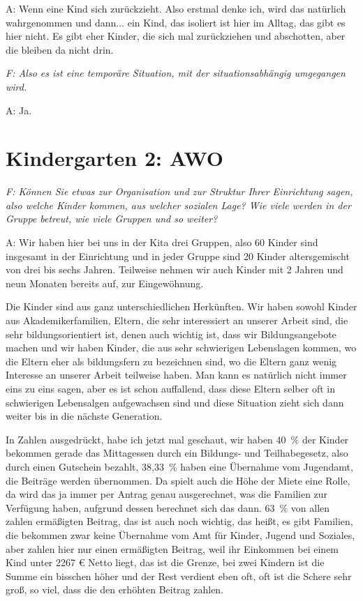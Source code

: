 \begin{linenumbers*}
A: Wenn eine Kind sich zurückzieht. Also erstmal denke ich, wird das natürlich wahrgenommen und dann... ein Kind, das isoliert ist hier im Alltag, das gibt es hier nicht. Es gibt eher Kinder, die sich mal zurückziehen und abschotten, aber die bleiben da nicht drin. 

\emph{F: Also es ist eine temporäre Situation, mit der situationsabhängig umgegangen wird.} 

A: Ja.    
   
\end{linenumbers*}

\section{Kindergarten 2: AWO}
\begin{linenumbers*}
\emph{F:  Können Sie etwas zur Organisation und zur Struktur Ihrer Einrichtung sagen, also welche Kinder kommen, aus welcher sozialen Lage? Wie viele werden in der Gruppe betreut, wie viele Gruppen und so weiter?} 

A: Wir haben hier bei uns in der Kita drei Gruppen, also 60 Kinder sind insgesamt in der Einrichtung und in jeder Gruppe sind 20 Kinder altersgemischt von drei bis sechs Jahren. Teilweise nehmen wir auch Kinder mit 2 Jahren und neun Monaten bereits auf, zur Eingewöhnung. 

Die Kinder sind aus ganz unterschiedlichen Herkünften. Wir haben sowohl Kinder aus Akademikerfamilien, Eltern, die sehr interessiert an unserer Arbeit sind, die sehr bildungsorientiert ist, denen auch wichtig ist, dass wir Bildungsangebote machen und wir haben Kinder, die aus sehr schwierigen Lebenslagen kommen, wo die Eltern eher als bildungsfern zu bezeichnen sind, wo die Eltern ganz wenig Interesse an unserer Arbeit teilweise haben. Man kann es natürlich nicht immer eins zu eins sagen, aber es ist schon auffallend, dass diese Eltern selber oft in schwierigen Lebensalgen aufgewachsen sind und diese Situation zieht sich dann weiter bis in die nächste Generation. 

In Zahlen ausgedrückt, habe ich jetzt mal geschaut, wir haben 40~\% der Kinder bekommen gerade das Mittagessen durch ein Bildungs- und Teilhabegesetz, also durch einen Gutschein bezahlt, 38,33~\% haben eine Übernahme vom Jugendamt, die Beiträge werden übernommen. Da spielt auch die Höhe der Miete eine Rolle, da wird das ja immer per Antrag genau ausgerechnet, was die Familien zur Verfügung haben, aufgrund dessen berechnet sich das dann. 63~\% von allen zahlen ermäßigten Beitrag, das ist auch noch wichtig, das heißt, es gibt Familien, die bekommen zwar keine Übernahme vom Amt für Kinder, Jugend und Soziales, aber zahlen hier nur einen ermäßigten Beitrag, weil ihr Einkommen bei einem Kind unter 2267 € Netto liegt, das ist die Grenze, bei zwei Kindern ist die Summe ein bisschen höher und der Rest verdient eben oft, oft ist die Schere sehr groß, so viel, dass die den erhöhten Beitrag zahlen.


\end{linenumbers*}
